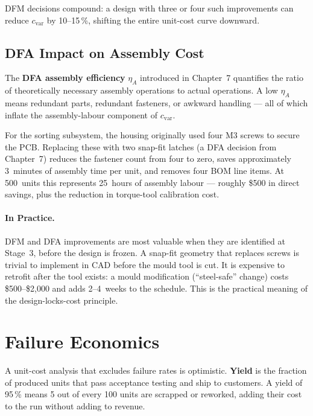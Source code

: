 DFM decisions compound: a design with three or four such improvements can
reduce $c_{\text{var}}$ by 10--15\,\%, shifting the entire unit-cost curve
downward.

\subsection{DFA Impact on Assembly Cost}
\label{sec:ch12-dfa-assembly}

The \textbf{DFA assembly efficiency} $\eta_A$
introduced in Chapter~7 quantifies the ratio of theoretically necessary
assembly operations to actual operations.
A low $\eta_A$ means redundant parts, redundant fasteners, or awkward handling
--- all of which inflate the assembly-labour component of $c_{\text{var}}$.

For the sorting subsystem, the housing originally used four M3 screws to secure
the PCB.
Replacing these with two snap-fit latches (a DFA decision from Chapter~7)
reduces the fastener count from four to zero, saves approximately 3~minutes of
assembly time per unit, and removes four BOM line items.
At 500~units this represents 25~hours of assembly labour --- roughly \$500 in
direct savings, plus the reduction in torque-tool calibration cost.

\paragraph{In Practice.}
DFM and DFA improvements are most valuable when they are identified at
Stage~3, before the design is frozen.
A snap-fit geometry that replaces screws is trivial to implement in CAD before
the mould tool is cut.
It is expensive to retrofit after the tool exists: a mould modification
(``steel-safe'' change) costs \$500--\$2{,}000 and adds 2--4~weeks to the
schedule.
This is the practical meaning of the design-locks-cost principle.

\section{Failure Economics}
\label{sec:ch12-failure}

A unit-cost analysis that excludes failure rates is optimistic.
\textbf{Yield} is the fraction of produced units that pass
acceptance testing and ship to customers.
A yield of 95\,\% means 5 out of every 100 units are scrapped or reworked,
adding their cost to the run without adding to revenue.

